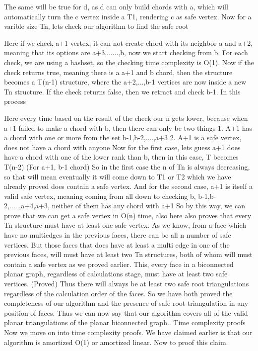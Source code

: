 \documentclass[12pt,a4paper]{article}
\begin{document}
The same will be true for d, as d can only build chords with a, which will automatically turn the c vertex inside a T1, rendering c as safe vertex.
Now for a varible size Tn, lets check our algorithm to find the safe root

Here if we check a+1 vertex, it can not create chord with its neighbor a and a+2, meaning that its options are a+3,......,b, now we start checking from b.
For each check, we are using a hashset, so the checking time complexity is O(1).
Now if the check returns true, meaning there is a a+1 and b chord, then the structure becomes a T(n-1) structure, where the a+2,...,b-1 vertices are now inside a new Tn structure. If the check returns false, then we retract and check b-1. In this process 

Here every time based on the result of the check our n gets lower, because when a+1 failed to make a chord with b, then there can only be two things
1.	A+1 has a chord with one or more from the set {b-1,b-2,....,a+3}
2.	A+1 is a safe vertex, does not have a chord with anyone
Now for the first case, lets guess a+1 does have a chord with one of the lower rank than b, then in this case, T becomes T(n-2)  (For a+1, b-1 chord)
So in the first case the n of Tn is always decreasing, so that will mean eventually it will come down to T1 or T2 which we have already proved does contain a safe vertex. 
And for the second case, a+1 is itself a valid safe vertex, meaning coming from all down to checking b, b-1,b-2,.....,a+4,a+3, neither of them has any chord with a+1
So by this way, we can prove that we can get a safe vertex in O(n) time, also here also proves that every Tn structure must have at least one safe vertex.
As we know, from a face which have no multiedges in the previous faces, there can be all n number of safe vertices. But those faces that does have at least a multi edge in one of the previous faces, will must have at least two Tn structures, both of whom will must contain a safe vertex as we proved earlier.
This, every face in a biconnected planar graph, regardless of calculations stage, must have at least two safe vertices. (Proved) Thus there will always be at least two safe root triangulations regardless of the calculation order of the faces.
So we have both proved the completeness of our algorithm and the presence of safe root triangulation in any position of faces. Thus we can now say that our algorithm covers all of the valid planar triangulations of the planar biconnected graph.. 
Time complexity proofs
Now we move on into time complexity proofs. We have claimed earlier is that our algorithm is amortized O(1) or amortized linear. Now to proof this claim.
\end{document}
